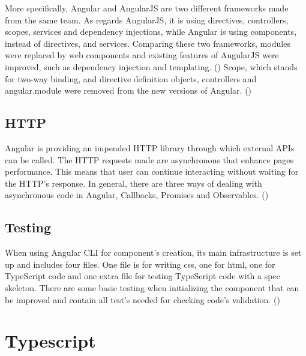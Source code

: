 More specifically, Angular and AngularJS are two different frameworks made from the same team. As regards AngularJS, it is using directives, controllers, scopes, services and dependency injections, while Angular is using components, instead of directives, and services. Comparing these two frameworks, modules were replaced by web components and existing features of AngularJS were improved, such as dependency injection and templating. (\cite{angularUpandRunning}) Scope, which stands for two-way binding, and directive definition objects, controllers and angular.module were removed from the new versions of Angular. (\cite{murray2018ng}) \par

\subsection{HTTP}

Angular is providing an impended HTTP library through which external APIs can be called. The HTTP requests made are asynchronous that enhance pages performance. This means that user can continue interacting without waiting for the HTTP's response. In general, there are three ways of dealing with asynchronous code in Angular, Callbacks, Promises and Observables. (\cite{murray2018ng})

\subsection{Testing}

When using Angular CLI for component's creation, its main infrastructure is set up and includes four files. One file is for writing css, one for html, one for TypeScript code and one extra file for testing TypeScript code with a spec skeleton. There are some basic testing when initializing the component that can be improved and contain all test's needed for checking code's validation. (\cite{angularUpandRunning}) \par

\section{Typescript}

